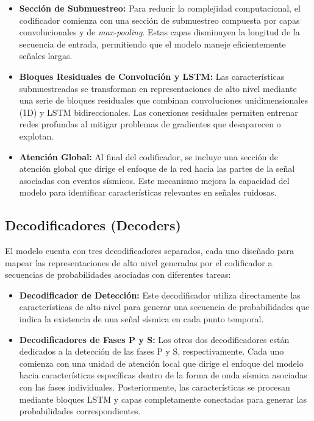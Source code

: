 \begin{itemize}
    \item \textbf{Sección de Submuestreo:} Para reducir la complejidad computacional, el codificador comienza con una sección de submuestreo compuesta por capas convolucionales y de \textit{max-pooling}. Estas capas disminuyen la longitud de la secuencia de entrada, permitiendo que el modelo maneje eficientemente señales largas.
    \item \textbf{Bloques Residuales de Convolución y LSTM:} Las características submuestreadas se transforman en representaciones de alto nivel mediante una serie de bloques residuales que combinan convoluciones unidimensionales (1D) y LSTM bidireccionales. Las conexiones residuales permiten entrenar redes profundas al mitigar problemas de gradientes que desaparecen o explotan.
    \item \textbf{Atención Global:} Al final del codificador, se incluye una sección de atención global que dirige el enfoque de la red hacia las partes de la señal asociadas con eventos sísmicos. Este mecanismo mejora la capacidad del modelo para identificar características relevantes en señales ruidosas.
\end{itemize}

\subsection{Decodificadores (Decoders)}

El modelo cuenta con tres decodificadores separados, cada uno diseñado para mapear las representaciones de alto nivel generadas por el codificador a secuencias de probabilidades asociadas con diferentes tareas:

\begin{itemize}
    \item \textbf{Decodificador de Detección:} Este decodificador utiliza directamente las características de alto nivel para generar una secuencia de probabilidades que indica la existencia de una señal sísmica en cada punto temporal.
    \item \textbf{Decodificadores de Fases P y S:} Los otros dos decodificadores están dedicados a la detección de las fases P y S, respectivamente. Cada uno comienza con una unidad de atención local que dirige el enfoque del modelo hacia características específicas dentro de la forma de onda sísmica asociadas con las fases individuales. Posteriormente, las características se procesan mediante bloques LSTM y capas completamente conectadas para generar las probabilidades correspondientes.
\end{itemize}

